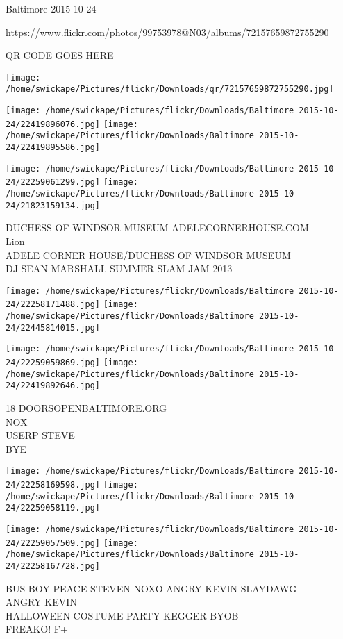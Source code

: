 \documentclass[10pt,letterpaper]{article}
\begin{document}
Baltimore 2015-10-24

https://www.flickr.com/photos/99753978@N03/albums/72157659872755290

QR CODE GOES HERE

\texttt{[image: /home/swickape/Pictures/flickr/Downloads/qr/72157659872755290.jpg]}
\pagebreak

\texttt{[image: /home/swickape/Pictures/flickr/Downloads/Baltimore 2015-10-24/22419896076.jpg]}
\texttt{[image: /home/swickape/Pictures/flickr/Downloads/Baltimore 2015-10-24/22419895586.jpg]}

\texttt{[image: /home/swickape/Pictures/flickr/Downloads/Baltimore 2015-10-24/22259061299.jpg]}
\texttt{[image: /home/swickape/Pictures/flickr/Downloads/Baltimore 2015-10-24/21823159134.jpg]}

DUCHESS OF WINDSOR MUSEUM ADELECORNERHOUSE.COM\\
Lion\\
ADELE CORNER HOUSE/DUCHESS OF WINDSOR MUSEUM\\
DJ SEAN MARSHALL SUMMER SLAM JAM 2013\\
\pagebreak

\texttt{[image: /home/swickape/Pictures/flickr/Downloads/Baltimore 2015-10-24/22258171488.jpg]}
\texttt{[image: /home/swickape/Pictures/flickr/Downloads/Baltimore 2015-10-24/22445814015.jpg]}

\texttt{[image: /home/swickape/Pictures/flickr/Downloads/Baltimore 2015-10-24/22259059869.jpg]}
\texttt{[image: /home/swickape/Pictures/flickr/Downloads/Baltimore 2015-10-24/22419892646.jpg]}

18 DOORSOPENBALTIMORE.ORG\\
NOX\\
USERP STEVE\\
BYE\\
\pagebreak

\texttt{[image: /home/swickape/Pictures/flickr/Downloads/Baltimore 2015-10-24/22258169598.jpg]}
\texttt{[image: /home/swickape/Pictures/flickr/Downloads/Baltimore 2015-10-24/22259058119.jpg]}

\texttt{[image: /home/swickape/Pictures/flickr/Downloads/Baltimore 2015-10-24/22259057509.jpg]}
\texttt{[image: /home/swickape/Pictures/flickr/Downloads/Baltimore 2015-10-24/22258167728.jpg]}

BUS BOY PEACE STEVEN NOXO ANGRY KEVIN SLAYDAWG\\
ANGRY KEVIN\\
HALLOWEEN COSTUME PARTY KEGGER BYOB\\
FREAKO!  F+\\
\pagebreak
\end{document}
